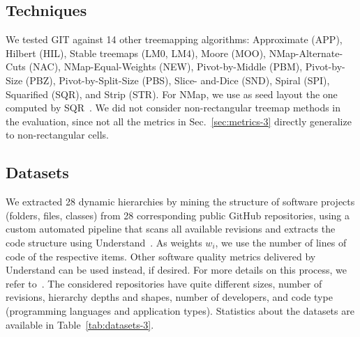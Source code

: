 \subsection{Techniques}
%
We tested GIT against 14 other treemapping algorithms: Approximate (APP), Hilbert (HIL), Stable treemaps (LM0, LM4), Moore (MOO), NMap-Alternate-Cuts (NAC), NMap-Equal-Weights (NEW), Pivot-by-Middle (PBM), Pivot-by-Size (PBZ), Pivot-by-Split-Size (PBS), Slice- and-Dice (SND), Spiral (SPI), Squarified (SQR), and Strip (STR). For NMap, we use as seed layout the one computed by SQR~\citep{nmap}. We did not consider non-rectangular treemap methods in the evaluation, since not all the metrics in Sec.~\ref{sec:metrics-3} directly generalize to non-rectangular cells.

\subsection{Datasets}
%
We extracted 28 dynamic hierarchies by mining the structure of software projects (folders, files, classes) from 28 corresponding public GitHub repositories, using a custom automated pipeline that scans all available revisions and extracts the code structure using Understand~\citep{understand}. As weights $w_i$, we use the number of lines of code of the respective items. Other software quality metrics delivered by Understand can be used instead, if desired. For more details on this process, we refer to~\citep{vmv}. The considered repositories have quite different sizes, number of revisions, hierarchy depths and shapes, number of developers, and code type (programming languages and application types). Statistics about the datasets are available in Table~\ref{tab:datasets-3}.

